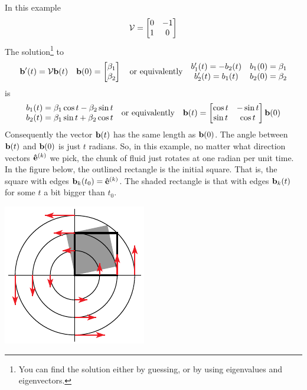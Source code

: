 \begin{eg}[$\vv(x,y)= -y\hi+x\hj$]\label{eg:flowRot}
In this example
\begin{equation*}
\mathcal{V}=\left[\begin{matrix}0&-1\cr 1&0\end{matrix}\right]
\end{equation*}
The solution\footnote{You can find the solution either by guessing, or by using eigenvalues and eigenvectors.} to 
\begin{equation*}
\mathbf{b}'(t)=\mathcal{V}\mathbf{b}(t)\quad 
\mathbf{b}(0)=\left[\begin{matrix}\beta_1 \\ \beta_2\end{matrix}\right]
\quad\text{or equivalently}\quad
\begin{matrix}b_1'(t)=-b_2(t) & b_1(0)=\beta_1\cr
        b_2'(t)=b_1(t) & b_2(0)=\beta_2\end{matrix}
\end{equation*}
is
\begin{equation*}
\begin{matrix}b_1(t)=\beta_1\cos t-\beta_2\sin t\cr
        b_2(t)=\beta_1\sin t+\beta_2\cos t\end{matrix}
\quad\text{or equivalently}\quad
\mathbf{b}(t)=\left[\begin{matrix}\cos t&-\sin t\cr \sin t&
                             \cos t\end{matrix}\right]\mathbf{b}(0)
\end{equation*}
Consequently the vector $\mathbf{b}(t)$ has the same length as $\mathbf{b}(0)$. 
The angle between $\mathbf{b}(t)$ and $\mathbf{b}(0)$ is just $t$ radians. So, 
in this example, no matter
what direction vectors $\mathbf{\hat e}^{(k)}$ we pick, the chunk of fluid just 
rotates at one radian
per unit time. In the figure below, the outlined
rectangle is the initial square. That is, the square with edges $\mathbf{b}_k(t_0)=\mathbf{\hat e}^{(k)}$.
The shaded rectangle is that with edges $\mathbf{b}_k(t)$ for some $t$ a bit
bigger than $t_0$.

\begin{nfig}
\begin{center}
    \includegraphics{square2.pdf}
\end{center}
\end{nfig}


\end{eg}


